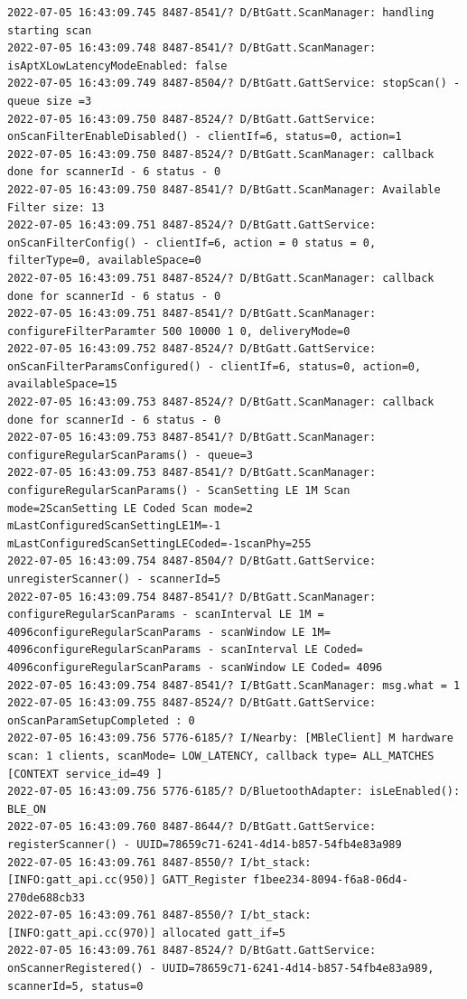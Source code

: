\documentclass[a4paper,12pt]{book}
\begin{document}
\begin{lstlisting}
2022-07-05 16:43:09.745 8487-8541/? D/BtGatt.ScanManager: handling starting scan
2022-07-05 16:43:09.748 8487-8541/? D/BtGatt.ScanManager: isAptXLowLatencyModeEnabled: false
2022-07-05 16:43:09.749 8487-8504/? D/BtGatt.GattService: stopScan() - queue size =3
2022-07-05 16:43:09.750 8487-8524/? D/BtGatt.GattService: onScanFilterEnableDisabled() - clientIf=6, status=0, action=1
2022-07-05 16:43:09.750 8487-8524/? D/BtGatt.ScanManager: callback done for scannerId - 6 status - 0
2022-07-05 16:43:09.750 8487-8541/? D/BtGatt.ScanManager: Available Filter size: 13
2022-07-05 16:43:09.751 8487-8524/? D/BtGatt.GattService: onScanFilterConfig() - clientIf=6, action = 0 status = 0, filterType=0, availableSpace=0
2022-07-05 16:43:09.751 8487-8524/? D/BtGatt.ScanManager: callback done for scannerId - 6 status - 0
2022-07-05 16:43:09.751 8487-8541/? D/BtGatt.ScanManager: configureFilterParamter 500 10000 1 0, deliveryMode=0
2022-07-05 16:43:09.752 8487-8524/? D/BtGatt.GattService: onScanFilterParamsConfigured() - clientIf=6, status=0, action=0, availableSpace=15
2022-07-05 16:43:09.753 8487-8524/? D/BtGatt.ScanManager: callback done for scannerId - 6 status - 0
2022-07-05 16:43:09.753 8487-8541/? D/BtGatt.ScanManager: configureRegularScanParams() - queue=3
2022-07-05 16:43:09.753 8487-8541/? D/BtGatt.ScanManager: configureRegularScanParams() - ScanSetting LE 1M Scan mode=2ScanSetting LE Coded Scan mode=2 mLastConfiguredScanSettingLE1M=-1 mLastConfiguredScanSettingLECoded=-1scanPhy=255
2022-07-05 16:43:09.754 8487-8504/? D/BtGatt.GattService: unregisterScanner() - scannerId=5
2022-07-05 16:43:09.754 8487-8541/? D/BtGatt.ScanManager: configureRegularScanParams - scanInterval LE 1M = 4096configureRegularScanParams - scanWindow LE 1M= 4096configureRegularScanParams - scanInterval LE Coded= 4096configureRegularScanParams - scanWindow LE Coded= 4096
2022-07-05 16:43:09.754 8487-8541/? I/BtGatt.ScanManager: msg.what = 1
2022-07-05 16:43:09.755 8487-8524/? D/BtGatt.GattService: onScanParamSetupCompleted : 0
2022-07-05 16:43:09.756 5776-6185/? I/Nearby: [MBleClient] M hardware scan: 1 clients, scanMode= LOW_LATENCY, callback type= ALL_MATCHES [CONTEXT service_id=49 ]
2022-07-05 16:43:09.756 5776-6185/? D/BluetoothAdapter: isLeEnabled(): BLE_ON
2022-07-05 16:43:09.760 8487-8644/? D/BtGatt.GattService: registerScanner() - UUID=78659c71-6241-4d14-b857-54fb4e83a989
2022-07-05 16:43:09.761 8487-8550/? I/bt_stack: [INFO:gatt_api.cc(950)] GATT_Register f1bee234-8094-f6a8-06d4-270de688cb33
2022-07-05 16:43:09.761 8487-8550/? I/bt_stack: [INFO:gatt_api.cc(970)] allocated gatt_if=5
2022-07-05 16:43:09.761 8487-8524/? D/BtGatt.GattService: onScannerRegistered() - UUID=78659c71-6241-4d14-b857-54fb4e83a989, scannerId=5, status=0

\end{lstlisting}
\end{document}
